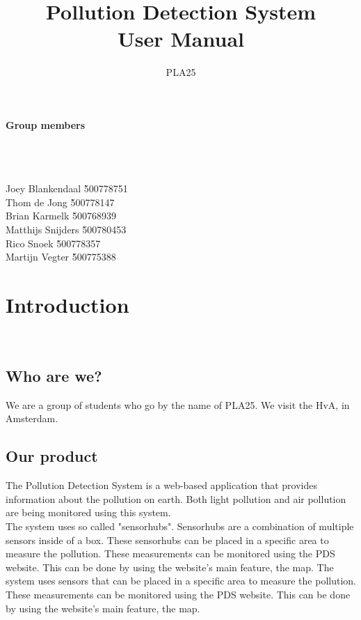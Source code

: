 \documentclass[a4paper]{article}
\title{Pollution Detection System\\User Manual}
\author{PLA25}
\begin{document}
\clearpage
\maketitle
\vspace*{\fill}

\paragraph{Group members}
~\\\\
\begin{tabbing}
Joey Blankendaal \` 500778751
\\
Thom de Jong \` 500778147
\\
Brian Karmelk \` 500768939
\\
Matthijs Snijders \` 500780453
\\
Rico Snoek \` 500778357
\\
Martijn Vegter \` 500775388
\end{tabbing}
\thispagestyle{empty}
\setcounter{page}{0}
\pagebreak
\tableofcontents
\pagebreak

\section{Introduction}
~\\

\subsection{Who are we?}
We are a group of students who go by the name of PLA25. We visit the HvA, in Amsterdam.
~\\

\subsection{Our product}
The Pollution Detection System is a web-based application that provides information about the pollution on earth. Both light pollution and air pollution are being monitored using this system.
\\
The system uses so called "sensorhubs". Sensorhubs are a combination of multiple sensors inside of a box. These sensorhubs can be placed in a specific area to measure the pollution. These measurements can be monitored using the PDS website. This can be done by using the website's main feature, the map.
The system uses sensors that can be placed in a specific area to measure the pollution. These measurements can be monitored using the PDS website. This can be done by using the website's main feature, the map.
\end{document}
